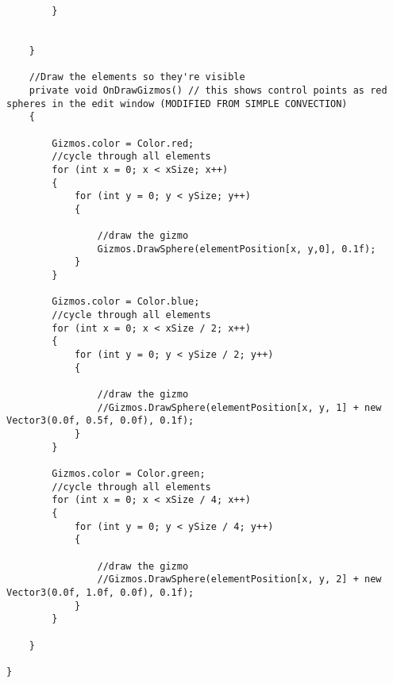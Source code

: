 \begin{mdframed}[linecolor=black, topline=true, bottomline=true,
  leftline=false, rightline=false]
\begin{verbatim}
        }


    }

    //Draw the elements so they're visible
    private void OnDrawGizmos() // this shows control points as red spheres in the edit window (MODIFIED FROM SIMPLE CONVECTION)
    {

        Gizmos.color = Color.red;
        //cycle through all elements
        for (int x = 0; x < xSize; x++)
        {
            for (int y = 0; y < ySize; y++)
            {

                //draw the gizmo
                Gizmos.DrawSphere(elementPosition[x, y,0], 0.1f);
            }
        }

        Gizmos.color = Color.blue;
        //cycle through all elements
        for (int x = 0; x < xSize / 2; x++)
        {
            for (int y = 0; y < ySize / 2; y++)
            {

                //draw the gizmo
                //Gizmos.DrawSphere(elementPosition[x, y, 1] + new Vector3(0.0f, 0.5f, 0.0f), 0.1f);
            }
        }

        Gizmos.color = Color.green;
        //cycle through all elements
        for (int x = 0; x < xSize / 4; x++)
        {
            for (int y = 0; y < ySize / 4; y++)
            {

                //draw the gizmo
                //Gizmos.DrawSphere(elementPosition[x, y, 2] + new Vector3(0.0f, 1.0f, 0.0f), 0.1f);
            }
        }

    }

}
\end{verbatim}
\end{mdframed}